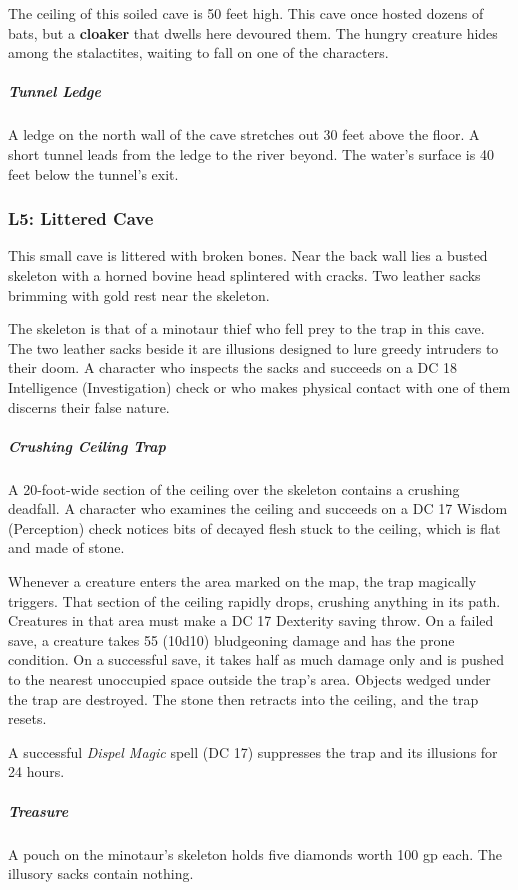 \documentclass[10pt,a4paper,twoside,bg=print,twocolumn,openany,nodeprecatedcode]{dndbook}
\begin{document}
The ceiling of this soiled cave is 50 feet high. This cave once hosted dozens of bats, but a \textbf{cloaker} that dwells here devoured them. The hungry creature hides among the stalactites, waiting to fall on one of the characters.

\subparagraph{Tunnel Ledge}
A ledge on the north wall of the cave stretches out 30 feet above the floor. A short tunnel leads from the ledge to the river beyond. The water's surface is 40 feet below the tunnel's exit.

\subsubsection{L5: Littered Cave}
\begin{DndReadAloud}{}
This small cave is littered with broken bones. Near the back wall lies a busted skeleton with a horned bovine head splintered with cracks. Two leather sacks brimming with gold rest near the skeleton.

\end{DndReadAloud}

The skeleton is that of a minotaur thief who fell prey to the trap in this cave. The two leather sacks beside it are illusions designed to lure greedy intruders to their doom. A character who inspects the sacks and succeeds on a DC 18 Intelligence (Investigation) check or who makes physical contact with one of them discerns their false nature.

\subparagraph{Crushing Ceiling Trap}
A 20-foot-wide section of the ceiling over the skeleton contains a crushing deadfall. A character who examines the ceiling and succeeds on a DC 17 Wisdom (Perception) check notices bits of decayed flesh stuck to the ceiling, which is flat and made of stone.

Whenever a creature enters the area marked on the map, the trap magically triggers. That section of the ceiling rapidly drops, crushing anything in its path. Creatures in that area must make a DC 17 Dexterity saving throw. On a failed save, a creature takes 55 (10d10) bludgeoning damage and has the prone condition. On a successful save, it takes half as much damage only and is pushed to the nearest unoccupied space outside the trap's area. Objects wedged under the trap are destroyed. The stone then retracts into the ceiling, and the trap resets.

A successful \textit{Dispel Magic} spell (DC 17) suppresses the trap and its illusions for 24 hours.

\subparagraph{Treasure}
A pouch on the minotaur's skeleton holds five diamonds worth 100 gp each. The illusory sacks contain nothing.
\end{document}
